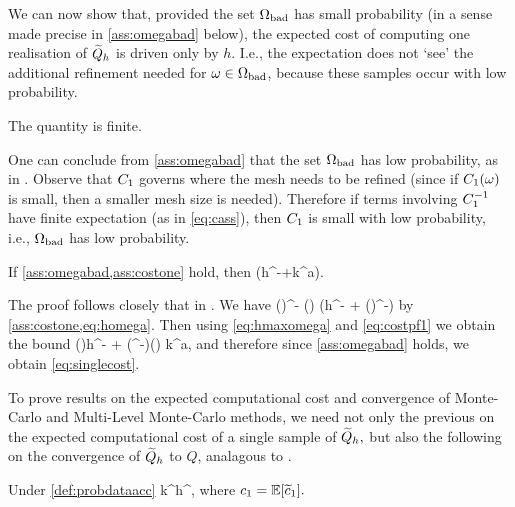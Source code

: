 We can now show that, provided the set $\Omega_{\mathrm{bad}}$ has small probability (in a sense made precise in \cref{ass:omegabad} below), the expected cost of computing one realisation of $\widetilde{Q}_{h}$ is driven only by $h.$ I.e., the expectation does not `see' the additional refinement needed for $\omega \in \Omega_{\mathrm{bad}}$, because these samples occur with low probability.

\bas\label{ass:omegabad}
The quantity
\beq\label{eq:cass}
\cth \de {}
\eeq
is finite.
\eas

One can conclude from \cref{ass:omegabad} that the set $\Omega_{\mathrm{bad}}$ has low probability, as in \cite[Text at the bottom of p. 21]{GrPaSc:19}. Observe that $C_{1}$ governs where the mesh needs to be refined (since if $C_{1}(\omega)$ is small, then a smaller mesh size is needed). Therefore if terms involving $C_{1}^{-1}$ have finite expectation (as in \cref{eq:cass}), then $C_{1}$ is small with low probability, i.e., $\Omega_{\mathrm{bad}}$ has low probability.

\label{lem:c}
If \cref{ass:omegabad,ass:costone} hold, then 
\beq\label{eq:singlecost}
\EXP{\Cost{\Qhtilde}} \leq \cth \mleft(h^{-\gamma}+k^{a\gamma}\mright).
\eeq
\ele

The proof follows closely that in \cite[Lemma 5.8]{GrPaSc:19}.
We have
\beq\label{eq:costpf1}
\Cost{\Qhtilde(\omega)} \leq \cthtilde(\omega)\homega^{-\gamma} \leq \cthtilde(\omega) \mleft(h^{-\gamma} + \mleft(\hmaxomega\mright)^{-\gamma}\mright)
\eeq
by \cref{ass:costone,eq:homega}. Then using \cref{eq:hmaxomega} and \cref{eq:costpf1} we obtain the bound
\beq\label{eq:costpf2}
\Cost{\Qhtilde(\omega)} \leq \cthtilde(\omega)h^{-\gamma} + \mleft(\cthtilde\Co^{-\gamma}\mright)(\omega) k^{a\gamma},
\eeq
and therefore since \cref{ass:omegabad} holds, we obtain \cref{eq:singlecost}.
\epf

To prove results on the expected computational cost and convergence of Monte-Carlo and Multi-Level Monte-Carlo methods, we need not only the previous  on the expected computational cost of a single sample of $\widetilde{Q}_{h},$ but also the following  on the convergence of $\widetilde{Q}_{h}$ to $Q$, analagous to \cite[Theorem 5.14]{GrPaSc:19}.

\label{ass:a}
Under \cref{def:probdataacc}
\beqs
{} \leq \co k^\sigma h^{\alpha},
\eeqs
where $\co = \EXP{\cotilde}.$
\ele

